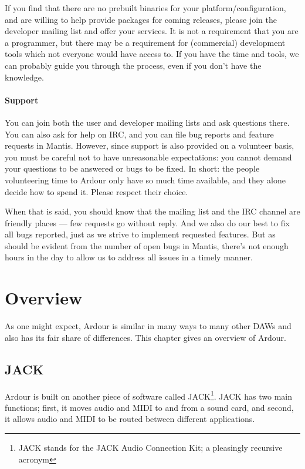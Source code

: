 \documentclass[10pt,a4paper]{book}
\begin{document}
If you find that there are no prebuilt binaries for your
platform/configuration, and are willing to help provide packages for
coming releases, please join the developer mailing list and offer your
services. It is not a requirement that you are a programmer, but there
may be a requirement for (commercial) development tools which not
everyone would have access to. If you have the time and tools, we can
probably guide you through the process, even if you don't have the
knowledge.

\subsubsection{Support}

You can join both the user and developer mailing lists and ask
questions there. You can also ask for help on IRC, and you can file
bug reports and feature requests in Mantis. However, since support is
also provided on a volunteer basis, you must be careful not to have
unreasonable expectations: you cannot demand your questions to be
answered or bugs to be fixed. In short: the people volunteering time
to Ardour only have so much time available, and they alone decide how
to spend it. Please respect their choice.

When that is said, you should know that the mailing list and the IRC
channel are friendly places --- few requests go without reply. And we
also do our best to fix all bugs reported, just as we strive to
implement requested features. But as should be evident from the number
of open bugs in Mantis, there's not enough hours in the day to allow
us to address all issues in a timely manner.


\chapter{Overview}

As one might expect, Ardour is similar in many ways to many other DAWs
and also has its fair share of differences.  This chapter gives an
overview of Ardour.


\section{JACK}

Ardour is built on another piece of software called JACK\footnote{JACK
  stands for the JACK Audio Connection Kit; a pleasingly recursive acronym}.
JACK has two main functions; first, it moves audio and MIDI to
and from a sound card, and second, it allows audio and MIDI to be
routed between different applications.
\end{document}
